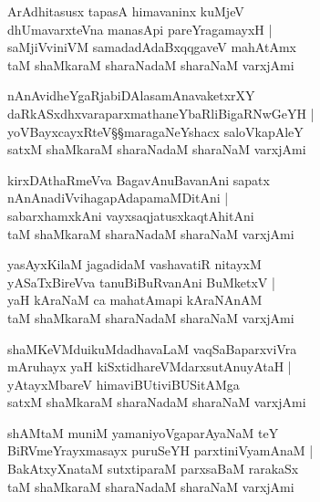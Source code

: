\begin{shloka}
ArAdhitasusx tapasA himavaninx kuMjeV\\
dhUmavarxteVna manasApi pareYragamayxH |\\
saMjiVviniVM samadadAdaBxqqgaveV mahAtAmx\\
taM shaMkaraM sharaNadaM sharaNaM varxjAmi
\end{shloka}

\begin{shloka}
nAnAvidheYgaRjabiDAlasamAnavaketxrXY\\
daRkASxdhxvaraparxmathaneYbaRliBigaRNwGeYH |\\
yoVBayxcayxRteV\S\S maragaNeYshacx saloVkapAleY\\
satxM shaMkaraM sharaNadaM sharaNaM varxjAmi
\end{shloka}

\begin{shloka}
kirxDAthaRmeVva BagavAnuBavanAni sapatx \\
nAnAnadiVvihagapAdapamaMDitAni |\\
sabarxhamxkAni vayxsaqjatusxkaqtAhitAni\\
taM shaMkaraM sharaNadaM sharaNaM varxjAmi
\end{shloka}

\begin{shloka}
yasAyxKilaM jagadidaM vashavatiR nitayxM\\
yASaTxBireVva tanuBiBuRvanAni BuMketxV |\\
yaH kAraNaM ca mahatAmapi kAraNAnAM \\
taM shaMkaraM sharaNadaM sharaNaM varxjAmi
\end{shloka}

\begin{shloka}
shaMKeVMduikuMdadhavaLaM vaqSaBaparxviVra\\
mAruhayx yaH kiSxtidhareVMdarxsutAnuyAtaH |\\
yAtayxMbareV himaviBUtiviBUSitAMga\\
satxM shaMkaraM sharaNadaM sharaNaM varxjAmi
\end{shloka}

\begin{shloka}
shAMtaM muniM yamaniyoVgaparAyaNaM teY\\
BiRVmeYrayxmasayx puruSeYH parxtiniVyamAnaM |\\
BakAtxyXnataM sutxtiparaM parxsaBaM rarakaSx\\
taM shaMkaraM sharaNadaM sharaNaM varxjAmi
\end{shloka}

